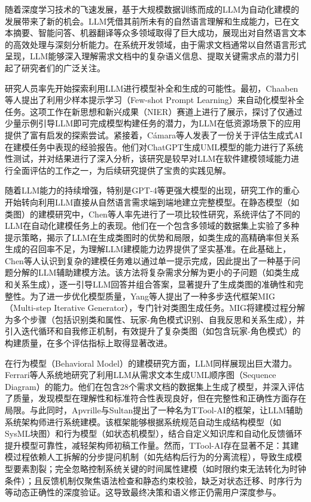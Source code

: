 随着深度学习技术的飞速发展，基于大规模数据训练而成的LLM为自动化建模的发展带来了新的机会。LLM凭借其前所未有的自然语言理解和生成能力，已在文本摘要、智能问答、机器翻译等众多领域取得了巨大成功，展现出对自然语言文本的高效处理与深刻分析能力。在系统开发领域，由于需求文档通常以自然语言形式呈现，LLM能够深入理解需求文档中的复杂语义信息、提取关键需求点的潜力引起了研究者们的广泛关注。

研究人员率先开始探索利用LLM进行模型补全和生成的可能性。最初，Chaaben等人提出了利用少样本提示学习（Few-shot Prompt Learning）来自动化模型补全任务。这项工作在新思想和新兴成果（NIER）赛道上进行了展示，探讨了仅通过少量示例引导LLM即可完成模型构建任务的潜力，为LLM在低资源场景下的应用提供了富有启发的探索尝试。紧接着，Cámara等人发表了一份关于评估生成式AI在建模任务中表现的经验报告。他们对ChatGPT生成UML模型的能力进行了系统性测试，并对结果进行了深入分析，该研究是较早对LLM在软件建模领域能力进行全面评估的工作之一，为后续研究提供了宝贵的实践见解。

随着LLM能力的持续增强，特别是GPT-4等更强大模型的出现，研究工作的重心开始转向利用LLM直接从自然语言需求端到端地建立完整模型。在静态模型（如类图）的建模研究中，Chen等人率先进行了一项比较性研究，系统评估了不同的LLM在自动化建模任务上的表现。他们在一个包含多领域的数据集上实验了多种提示策略，揭示了LLM在生成类图时的优势和局限，如类生成的高精确率但关系生成的召回率不足，为理解LLM建模能力边界提供了坚实基准。在此基础上，Chen等人认识到复杂的建模任务难以通过单一提示完成，因此提出了一种基于问题分解的LLM辅助建模方法。该方法将复杂需求分解为更小的子问题（如类生成和关系生成），逐一引导LLM回答并组合答案，显著提升了生成类图的准确性和完整性。为了进一步优化模型质量，Yang等人提出了一种多步迭代框架MIG（Multi-step Iterative Generator），专门针对类图生成任务。MIG将建模过程分解为多个步骤（包括识别类和属性、玩家-角色模式识别、自我反思和关系生成），并引入迭代循环和自我修正机制，有效提升了复杂类图（如包含玩家-角色模式）的构建质量，在多个评估指标上取得显著改进。

在行为模型（Behavioral Model）的建模研究方面，LLM同样展现出巨大潜力。Ferrari等人系统地研究了利用LLM从需求文本生成UML顺序图（Sequence Diagram）的能力。他们在包含28个需求文档的数据集上生成了模型，并深入评估了质量，发现模型在理解性和标准符合性表现良好，但在完整性和正确性方面存在局限。与此同时，Apvrille与Sultan提出了一种名为TTool-AI的框架，让LLM辅助系统架构师进行系统建模。该框架能够根据系统规范自动生成结构模型（如SysML块图）和行为模型（如状态机模型），结合自定义知识库和自动化反馈循环提升模型可靠性，减轻架构师初稿工作量。然而，TTool-AI存在显著不足：其建模过程依赖人工拆解的分步提问机制（如先结构后行为的分离流程），导致生成模型要素割裂；完全忽略控制系统关键的时间属性建模（如时限约束无法转化为时钟条件）；且反馈机制仅聚焦语法检查和静态约束校验，缺乏对状态迁移、时序行为等动态正确性的深度验证。这导致最终决策和语义修正仍需用户深度参与。

